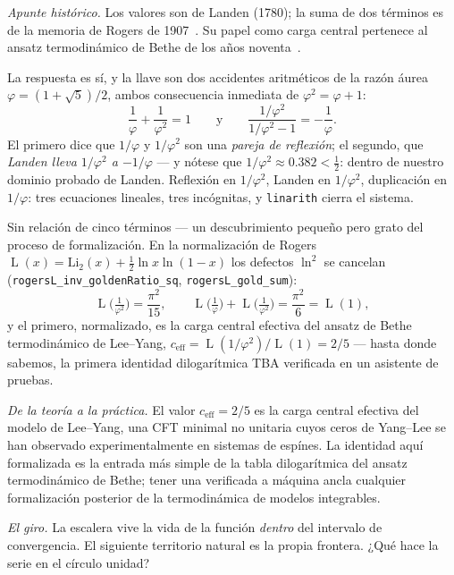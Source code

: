 \documentclass[11pt]{article}
\newcommand{\lean}[1]{\texttt{#1}}
\newcommand{\Li}{\mathrm{Li}_2}
\DeclareMathOperator{\Lrog}{L}
\newcommand{\keyeq}[1]{\begin{center}\keybox{$\displaystyle #1$}\end{center}}
\begin{document}
\emph{Apunte hist\'orico.} Los valores son de Landen (1780); la suma de dos t\'erminos
es de la memoria de Rogers de 1907~\cite{rogers}. Su papel como carga central pertenece
al ansatz termodin\'amico de Bethe de los a\~nos
noventa~\cite{zamolodchikov,nahm,kirillov}.

La respuesta es s\'i, y la llave son dos accidentes aritm\'eticos de la raz\'on \'aurea
$\varphi=(1+\sqrt5)/2$, ambos consecuencia inmediata de $\varphi^2=\varphi+1$:
\[
\frac{1}{\varphi}+\frac{1}{\varphi^2}=1
\qquad\text{y}\qquad
\frac{1/\varphi^2}{1/\varphi^2-1}=-\frac{1}{\varphi}.
\]
El primero dice que $1/\varphi$ y $1/\varphi^2$ son una \emph{pareja de reflexi\'on}; el
segundo, que \emph{Landen lleva $1/\varphi^2$ a $-1/\varphi$} --- y n\'otese que
$1/\varphi^2\approx0.382<\tfrac12$: dentro de nuestro dominio probado de Landen.
Reflexi\'on en $1/\varphi^2$, Landen en $1/\varphi^2$, duplicaci\'on en $1/\varphi$:
tres ecuaciones lineales, tres inc\'ognitas, y \lean{linarith} cierra el sistema.
\keyeq{
\Li\!\Big(\tfrac{1}{\varphi^2}\Big)=\tfrac{\pi^2}{15}-\ln^2\varphi,
\qquad
\Li\!\Big(\tfrac{1}{\varphi}\Big)=\tfrac{\pi^2}{10}-\ln^2\varphi,
\qquad
\Li\!\Big(-\tfrac{1}{\varphi}\Big)=\tfrac{\ln^2\varphi}{2}-\tfrac{\pi^2}{15}.
}
Sin relaci\'on de cinco t\'erminos --- un descubrimiento peque\~no pero grato del proceso
de formalizaci\'on. En la normalizaci\'on de Rogers
$\Lrog(x)=\Li(x)+\tfrac12\ln x\ln(1-x)$ los defectos $\ln^2$ se cancelan
(\lean{rogersL\_inv\_goldenRatio\_sq}, \lean{rogersL\_gold\_sum}):
\[
\Lrog\!\Big(\tfrac{1}{\varphi^2}\Big)=\frac{\pi^2}{15},\qquad
\Lrog\!\Big(\tfrac{1}{\varphi}\Big)+\Lrog\!\Big(\tfrac{1}{\varphi^2}\Big)
=\frac{\pi^2}{6}=\Lrog(1),
\]
y el primero, normalizado, es la carga central efectiva del ansatz de Bethe
termodin\'amico de Lee--Yang, $c_{\mathrm{eff}}=\Lrog(1/\varphi^2)/\Lrog(1)=2/5$ ---
hasta donde sabemos, la primera identidad dilogar\'itmica TBA verificada en un asistente
de pruebas.

\emph{De la teor\'ia a la pr\'actica.} El valor $c_{\mathrm{eff}}=2/5$ es la carga
central efectiva del modelo de Lee--Yang, una CFT minimal no unitaria cuyos ceros de
Yang--Lee se han observado experimentalmente en sistemas de esp\'ines. La identidad aqu\'i
formalizada es la entrada m\'as simple de la tabla dilogar\'itmica del ansatz
termodin\'amico de Bethe; tener una verificada a m\'aquina ancla cualquier
formalizaci\'on posterior de la termodin\'amica de modelos integrables.

\emph{El giro.} La escalera vive la vida de la funci\'on \emph{dentro} del intervalo de
convergencia. El siguiente territorio natural es la propia frontera. ¿Qu\'e hace la
serie en el c\'irculo unidad?
\end{document}
